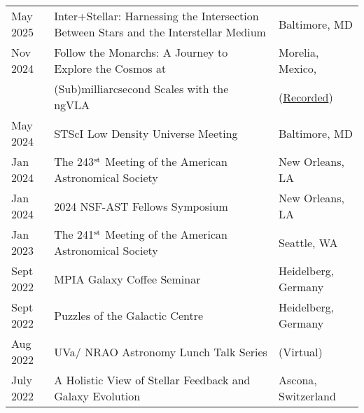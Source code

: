 \documentclass[11pt]{article}
\begin{document}
\begin{longtable}{p{} p{}p{}}

May 2025 & Inter+Stellar: Harnessing the Intersection Between Stars and the Interstellar Medium & {\small Baltimore, MD}\\

Nov 2024 & Follow the Monarchs: A Journey to Explore the Cosmos at  & {\small Morelia, Mexico,}\\
& (Sub)milliarcsecond Scales with the ngVLA & {\small(\href{https://youtu.be/CHdCz9VyqIM?si=kyrCyJ9LXm9UtWOj&t=3514}{Recorded})}\\

May 2024 & STScI Low Density Universe Meeting & {\small Baltimore, MD}\\

Jan 2024 & The 243$^{\rm st}$ Meeting of the American Astronomical Society & {\small New Orleans, LA}\\

Jan 2024 & 2024 NSF-AST Fellows Symposium & {\small New Orleans, LA}\\

Jan 2023 & The 241$^{\rm st}$ Meeting of the American Astronomical Society & {\small Seattle, WA}\\


Sept 2022 & MPIA Galaxy Coffee Seminar & {\small Heidelberg, Germany}\\

Sept 2022 & Puzzles of the Galactic Centre & {\small Heidelberg, Germany}\\

Aug 2022 & UVa/ NRAO Astronomy Lunch Talk Series & {\small (Virtual)}\\

July 2022 & A Holistic View of Stellar Feedback and Galaxy Evolution & {\small Ascona, Switzerland}\\





\end{longtable}
\end{document}
